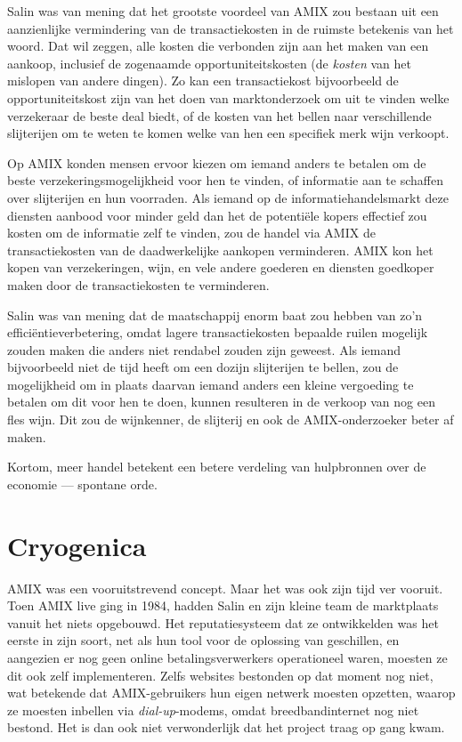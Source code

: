 \documentclass[
  a5paper,
  smalldemyvopaper,11pt,twoside,onecolumn,openright,extrafontsizes,
hidelinks]{memoir}
\begin{document}
Salin was van mening dat het grootste voordeel van AMIX zou bestaan uit
een aanzienlijke vermindering van de transactiekosten in de ruimste
betekenis van het woord. Dat wil zeggen, alle kosten die verbonden zijn
aan het maken van een aankoop, inclusief de zogenaamde
opportuniteitskosten (de \emph{kosten} van het mislopen van andere
dingen). Zo kan een transactiekost bijvoorbeeld de opportuniteitskost
zijn van het doen van marktonderzoek om uit te vinden welke verzekeraar
de beste deal biedt, of de kosten van het bellen naar verschillende
slijterijen om te weten te komen welke van hen een specifiek merk wijn
verkoopt.

Op AMIX konden mensen ervoor kiezen om iemand anders te betalen om de
beste verzekeringsmogelijkheid voor hen te vinden, of informatie aan te
schaffen over slijterijen en hun voorraden. Als iemand op de
informatiehandelsmarkt deze diensten aanbood voor minder geld dan het de
potentiële kopers effectief zou kosten om de informatie zelf te vinden,
zou de handel via AMIX de transactiekosten van de daadwerkelijke
aankopen verminderen. AMIX kon het kopen van verzekeringen, wijn, en
vele andere goederen en diensten goedkoper maken door de
transactiekosten te verminderen.

Salin was van mening dat de maatschappij enorm baat zou hebben van zo'n
efficiëntieverbetering, omdat lagere transactiekosten bepaalde ruilen
mogelijk zouden maken die anders niet rendabel zouden zijn geweest. Als
iemand bijvoorbeeld niet de tijd heeft om een dozijn slijterijen te
bellen, zou de mogelijkheid om in plaats daarvan iemand anders een
kleine vergoeding te betalen om dit voor hen te doen, kunnen resulteren
in de verkoop van nog een fles wijn. Dit zou de wijnkenner, de slijterij
en ook de AMIX-onderzoeker beter af maken.

Kortom, meer handel betekent een betere verdeling van hulpbronnen over
de economie --- spontane orde.

\section{Cryogenica}\label{cryogenica}

AMIX was een vooruitstrevend concept. Maar het was ook zijn tijd ver
vooruit. Toen AMIX live ging in 1984, hadden Salin en zijn kleine team
de marktplaats vanuit het niets opgebouwd. Het reputatiesysteem dat ze
ontwikkelden was het eerste in zijn soort, net als hun tool voor de
oplossing van geschillen, en aangezien er nog geen online
betalingsverwerkers operationeel waren, moesten ze dit ook zelf
implementeren. Zelfs websites bestonden op dat moment nog niet, wat
betekende dat AMIX-gebruikers hun eigen netwerk moesten opzetten, waarop
ze moesten inbellen via \emph{dial-up}-modems, omdat breedbandinternet
nog niet bestond. Het is dan ook niet verwonderlijk dat het project
traag op gang kwam.
\end{document}

